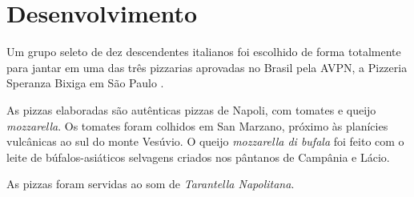 \section{Desenvolvimento}

Um grupo seleto de dez descendentes italianos foi escolhido de forma totalmente
para jantar em uma das três pizzarias aprovadas no 
Brasil pela AVPN, a Pizzeria Speranza Bixiga 
em São Paulo \cite{AVPN}.

As pizzas elaboradas são autênticas pizzas de Napoli, com tomates e queijo
\textsl{mozzarella}.  Os tomates foram colhidos em San Marzano, próximo às 
planícies vulcânicas ao sul do monte Vesúvio.  O queijo
\textsl{mozzarella di bufala} foi feito com o leite de búfalos-asiáticos 
selvagens criados nos pântanos de Campânia e Lácio.

As pizzas foram servidas ao som de \textsl{Tarantella Napolitana}.

